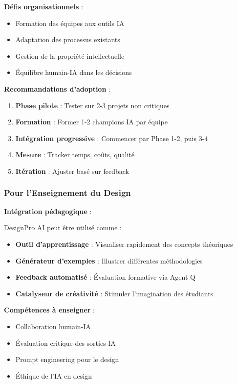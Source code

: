 \textbf{Défis organisationnels} :
\begin{itemize}[leftmargin=*]
    \item Formation des équipes aux outils IA
    \item Adaptation des processus existants
    \item Gestion de la propriété intellectuelle
    \item Équilibre humain-IA dans les décisions
\end{itemize}

\textbf{Recommandations d'adoption} :
\begin{enumerate}[leftmargin=*]
    \item \textbf{Phase pilote} : Tester sur 2-3 projets non critiques
    \item \textbf{Formation} : Former 1-2 champions IA par équipe
    \item \textbf{Intégration progressive} : Commencer par Phase 1-2, puis 3-4
    \item \textbf{Mesure} : Tracker temps, coûts, qualité
    \item \textbf{Itération} : Ajuster basé sur feedback
\end{enumerate}

\subsubsection{Pour l'Enseignement du Design}

\textbf{Intégration pédagogique} :

DesignPro AI peut être utilisé comme :
\begin{itemize}[leftmargin=*]
    \item \textbf{Outil d'apprentissage} : Visualiser rapidement des concepts théoriques
    \item \textbf{Générateur d'exemples} : Illustrer différentes méthodologies
    \item \textbf{Feedback automatisé} : Évaluation formative via Agent Q
    \item \textbf{Catalyseur de créativité} : Stimuler l'imagination des étudiants
\end{itemize}

\textbf{Compétences à enseigner} :
\begin{itemize}[leftmargin=*]
    \item Collaboration humain-IA
    \item Évaluation critique des sorties IA
    \item Prompt engineering pour le design
    \item Éthique de l'IA en design
\end{itemize}


